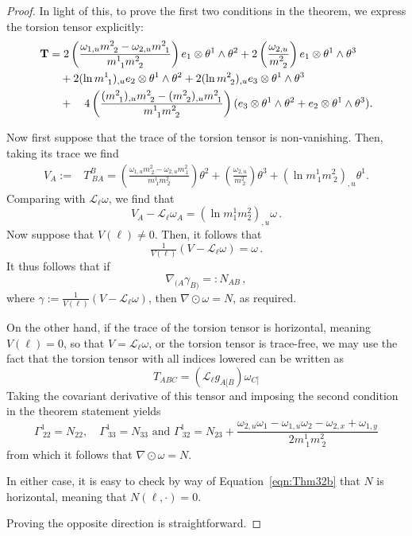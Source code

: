 \documentclass[10pt,a4paper]{amsart}
\newcommand{\ai}{A}
\newcommand{\bb}{B}
\newcommand{\cc}{C}
\begin{document}
\begin{proof}
    In light of this, to prove the first two conditions in the theorem, we express the torsion tensor explicitly: 
        \begin{equation}
    \begin{aligned}
        {\bf T} &= 2 \left( \frac{ \omega_{1,u} m^2_{~2}-\omega_{2,u}m^2_{~1}}{m^1_{~1} m^2_{~2}} \right) e_1 \otimes \theta^1 \wedge \theta^2 + 2\left( \frac{\omega_{2,u}}{m^2_{~2}} \right) e_1 \otimes \theta^1 \wedge \theta^3 \\ 
        &\quad + 2(\ln m^1_{~1})_{,u} e_2 \otimes \theta^1 \wedge \theta^2 + 2(\ln m^2_{~2})_{,u} e_3\otimes \theta^1  \wedge \theta^3  \\
        &\quad  + \quad 4 \left(\frac{(m^2_{~1})_{,u} m^2_{~2} - (m^2_{~2})_{,u} m^2_{~1}}{m^1_{~1} m^2_{~2}} \right) (e_3 \otimes \theta^1 \wedge \theta^2 + e_2 \otimes \theta^1 \wedge \theta^3).
    \end{aligned}
    \end{equation}

\medskip

    Now first suppose that the trace of the torsion tensor is non-vanishing. Then, taking its trace we find
    \begin{equation}
    \begin{aligned}
            V_\ai :=&  T^\bb_{~\bb \ai} = \left( \frac{ \omega_{1,u} m^2_{~2}-\omega_{2,u}m^2_{~1}}{m^1_{~1} m^2_{~2}} \right) \theta^2 + \left( \frac{\omega_{2,u}}{m^2_{~2}} \right) \theta^3 + (\ln m^1_{~1} m^2_{~2} )_{,u} \theta^1.
    \end{aligned}
    \end{equation}
    Comparing with $\mathcal{L}_{\ell} \omega$, we find that
    $$V_\ai - \mathcal{L}_{\ell} \omega_\ai = (\ln m^1_1 m^2_2)_{,u} \omega\,.$$
    Now suppose that $V(\ell) \neq 0$. Then, it follows that 
    \begin{equation}
        \tfrac{1}{V(\ell)} (V - \mathcal{L}_\ell \omega) = \omega\,.
    \end{equation}
    \noindent It thus follows that if
    $$\nabla_{(\ai} \gamma_{\bb)} =: N_{\ai \bb}\,,$$
    where
    $\gamma := \tfrac{1}{V(\ell)} (V - \mathcal{L}_\ell \omega)$, then $\nabla \odot \omega = N$, as required.

    On the other hand,
    if the trace of the torsion tensor is horizontal, meaning $V(\ell) = 0$, so that $V = \mathcal{L}_\ell \omega$, or the torsion tensor is trace-free, we may use the fact that the torsion tensor with all indices lowered can be written as 
    \begin{equation}
        T_{\ai \bb \cc} = (\mathcal{L}_\ell g_{\ai[\bb}) \omega_{\cc]}
    \end{equation}
    \noindent Taking the covariant derivative of this tensor and imposing the second condition in the theorem statement  yields $$\Gamma^1_{~22} = N_{22}, \quad \Gamma^1_{~33} = N_{33} \text{ and } \Gamma^1_{~32} = N_{23} +  \frac{\omega_{2,u} \omega_1- \omega_{1,u} \omega_2 - \omega_{2,x}+\omega_{1,y}}{2 m^1_{~1} m^2_{~2}}$$ from which it follows that $ \nabla \odot\omega = N$.

    In either case, it is easy to check by way of Equation~\ref{eqn:Thm32b} that $N$ is horizontal, meaning that $N(\ell,\cdot) = 0$.
    
    Proving the opposite direction is straightforward.

    \end{proof}
\end{document}
